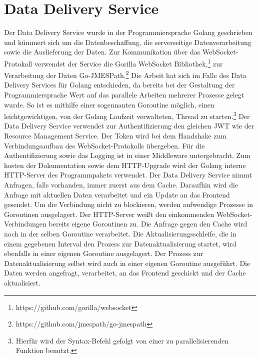 \section{Data Delivery Service}
\label{sec:datadeliveryservice}
Der Data Delivery Service wurde in der Programmiersprache Golang geschrieben und kümmert sich um die Datenbeschaffung,
die serverseitige Datenverarbeitung sowie die Auslieferung der Daten. Zur Kommunikation über das WebSocket-Protokoll
verwendet der Service die Gorilla WebSocket Bibliothek,\footnote{https://github.com/gorilla/websocket} zur Verarbeitung
der Daten Go-JMESPath.\footnote{https://github.com/jmespath/go-jmespath} Die Arbeit hat sich im Falle des
Data Delivery Services für Golang entschieden, da bereits bei der Gestaltung der Programmiersprache Wert auf
das parallele Arbeiten mehrerer Prozesse gelegt wurde. So ist es mithilfe einer sogennanten Goroutine möglich,
einen leichtgewichtigen, von der Golang Laufzeit verwalteten, Thread zu starten.\footnote{Hierfür
wird der Syntax-Befehl  gefolgt von einer zu parallelisierenden Funktion benutzt.\cite{GoroutinesExample}}
Der Data Delivery Service verwendet zur Authentifizierung den gleichen JWT wie der Resource Management Service.
Der Token wird bei dem Handshake zum Verbindungsaufbau des WebSocket-Protokolls übergeben. Für die Authentifizierung
sowie das Logging ist in einer Middleware untergebracht. Zum hosten der Dokumentation sowie dem HTTP-Upgrade
wird der Golang interne HTTP-Server des  Programmpakets verwendet. Der Data Delivery Service
nimmt Anfragen, falls vorhanden, immer zuerst aus dem Cache. Daraufhin wird die Anfrage mit aktuellen Daten
verarbeitet und ein Update an das Frontend gesendet. Um die Verbindung nicht zu blockieren, werden aufwendige
Prozesse in Goroutinen ausgelagert. Der HTTP-Server weißt den einkommenden WebSocket-Verbindungen bereits
eigene Goroutinen zu. Die Anfrage gegen den Cache wird noch in der selben Goroutine verarbeitet.
Die Aktualisierungsschleife, die in einem gegebenen Interval den Prozess zur Datenaktualisierung startet,
wird ebenfalls in einer eigenen Goroutine ausgelagert. Der Prozess zur Datenaktualisierung selbst wird
auch in einer eigenen Goroutine ausgeführt. Die Daten werden angefragt, verarbeitet, an das Frontend geschickt
und der Cache aktualisiert.
